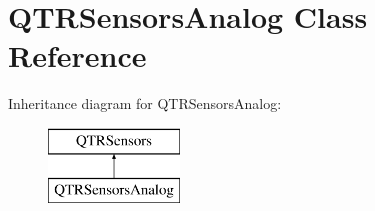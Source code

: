 \hypertarget{class_q_t_r_sensors_analog}{}\section{Q\+T\+R\+Sensors\+Analog Class Reference}
\label{class_q_t_r_sensors_analog}
Inheritance diagram for Q\+T\+R\+Sensors\+Analog\+:\begin{figure}[H]
\begin{center}
\leavevmode
\includegraphics[height=2.000000cm]{class_q_t_r_sensors_analog}
\end{center}
\end{figure}
